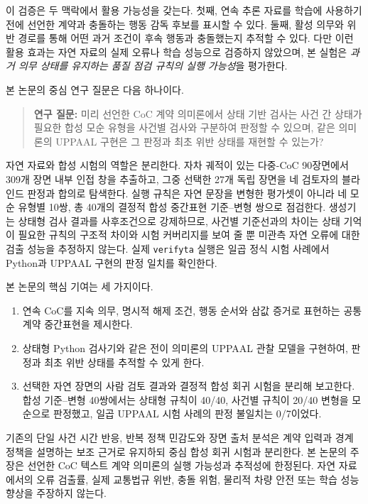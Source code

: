 이 검증은 두 맥락에서 활용 가능성을 갖는다. 첫째, 연속 추론 자료를 학습에 사용하기 전에 선언한 계약과 충돌하는 행동 감독 후보를 표시할 수 있다. 둘째, 활성 의무와 위반 경로를 통해 어떤 과거 조건이 후속 행동과 충돌했는지 추적할 수 있다. 다만 이런 활용 효과는 자연 자료의 실제 오류나 학습 성능으로 검증하지 않았으며, 본 실험은 \emph{과거 의무 상태를 유지하는 품질 점검 규칙의 실행 가능성}을 평가한다.

본 논문의 중심 연구 질문은 다음 하나이다.

\begin{quote}
\textbf{연구 질문:} 미리 선언한 CoC 계약 의미론에서 상태 기반 검사는 사건 간 상태가 필요한 합성 모순 유형을 사건별 검사와 구분하여 판정할 수 있으며, 같은 의미론의 UPPAAL 구현은 그 판정과 최초 위반 상태를 재현할 수 있는가?
\end{quote}

자연 자료와 합성 시험의 역할은 분리한다. 자차 궤적이 있는 다중-CoC 90장면에서 309개 장면 내부 인접 창을 추출하고, 그중 선택한 27개 독립 장면을 네 검토자의 블라인드 판정과 합의로 탐색한다. 실행 규칙은 자연 문장을 변형한 평가셋이 아니라 네 모순 유형별 10쌍, 총 40개의 결정적 합성 중간표현 기준--변형 쌍으로 점검한다. 생성기는 상태형 검사 결과를 사후조건으로 강제하므로, 사건별 기준선과의 차이는 상태 기억이 필요한 규칙의 구조적 차이와 시험 커버리지를 보여 줄 뿐 미관측 자연 오류에 대한 검출 성능을 추정하지 않는다. 실제 \texttt{verifyta} 실행은 일곱 정식 시험 사례에서 Python과 UPPAAL 구현의 판정 일치를 확인한다.

본 논문의 핵심 기여는 세 가지이다.

\begin{enumerate}
    \item 연속 CoC를 지속 의무, 명시적 해제 조건, 행동 순서와 삼값 증거로 표현하는 공통 계약 중간표현을 제시한다.
    \item 상태형 Python 검사기와 같은 전이 의미론의 UPPAAL 관찰 모델을 구현하여, 판정과 최초 위반 상태를 추적할 수 있게 한다.
    \item 선택한 자연 장면의 사람 검토 결과와 결정적 합성 회귀 시험을 분리해 보고한다. 합성 기준--변형 40쌍에서는 상태형 규칙이 40/40, 사건별 규칙이 20/40 변형을 모순으로 판정했고, 일곱 UPPAAL 시험 사례의 판정 불일치는 0/7이었다.
\end{enumerate}

기존의 단일 사건 시간 반응, 반복 정책 민감도와 장면 출처 분석은 계약 입력과 경계 정책을 설명하는 보조 근거로 유지하되 중심 합성 회귀 시험과 분리한다. 본 논문의 주장은 선언한 CoC 텍스트 계약 의미론의 실행 가능성과 추적성에 한정된다. 자연 자료에서의 오류 검출률, 실제 교통법규 위반, 충돌 위험, 물리적 차량 안전 또는 학습 성능 향상을 주장하지 않는다.
